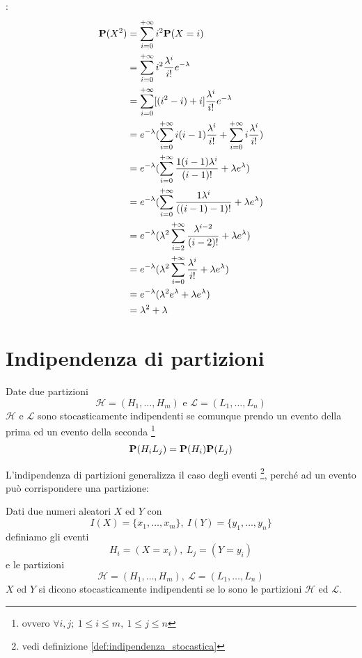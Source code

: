 :
\begin{align*}
  \mathbf{P}(X^2) &= \sum_{i=0}^{+ \infty} i^2 \mathbf{P}(X = i) \\
  &= \sum_{i=0}^{+ \infty} i^2 \frac{\lambda^i}{i!} e^{- \lambda} \\
  &= \sum_{i=0}^{+ \infty} [(i^2 - i) + i] \frac{\lambda^i}{i!} e^{- \lambda} \\
  &= e^{- \lambda} (\sum_{i=0}^{+ \infty} i(i - 1) \frac{\lambda^i}{i!} + \sum_{i=0}^{+ \infty} i \frac{\lambda^i}{i!}) \\
  &= e^{- \lambda} (\sum_{i=0}^{+ \infty} \frac{1(i - 1)\lambda^i}{(i-1)!} + \lambda e^\lambda) \\
  &= e^{- \lambda} (\sum_{i=0}^{+ \infty} \frac{1\lambda^i}{((i-1)-1)!} + \lambda e^\lambda) \\
  &= e^{- \lambda} (\lambda^2 \sum_{i=2}^{+ \infty} \frac{\lambda^{i-2}}{(i-2)!} + \lambda e^\lambda) \\
  &= e^{- \lambda} (\lambda^2 \sum_{i=0}^{+ \infty} \frac{\lambda^i}{i!} + \lambda e^\lambda) \\
  &= e^{- \lambda} (\lambda^2 e^\lambda + \lambda e^\lambda) \\
  &= \lambda^2 + \lambda
\end{align*}

\section{Indipendenza di partizioni} %
\begin{definition}
  \label{def:indipendenza_di_partizioni}
  Date due partizioni
  \[ \mathcal{H} = (H_1, \ldots, H_m) \text{ e } \mathcal{L} = (L_1, \ldots, L_n) \]
  \( \mathcal{H} \) e \( \mathcal{L} \) sono stocasticamente indipendenti se comunque prendo un evento della prima ed un evento della seconda
  \footnote{ovvero \( \forall i, j; ~ 1 \le i \le m, ~ 1 \le j \le n \)}
  \[ \mathbf{P}(H_i L_j) = \mathbf{P}(H_i) \mathbf{P}(L_j) \]
\end{definition}

L'indipendenza di partizioni generalizza il caso degli eventi
\footnote{vedi definizione \ref{def:indipendenza_stocastica}},
perché ad un evento può corrispondere una partizione:
\begin{definition}
  Dati due numeri aleatori \( X \) ed \( Y \) con
  \[ I(X) = \{ x_1, \ldots, x_m \}, ~ I(Y) = \{ y_1, \ldots, y_n \} \]
  definiamo gli eventi
  \[ H_i = (X = x_i), ~ L_j = (Y = y_i) \]
  e le partizioni
  \[ \mathcal{H} = (H_1, \ldots, H_m), ~ \mathcal{L} = (L_1, \ldots, L_n) \]
  \( X \) ed \( Y \) si dicono stocasticamente indipendenti se lo sono le partizioni \( \mathcal{H} \) ed \( \mathcal{L} \).
\end{definition}
